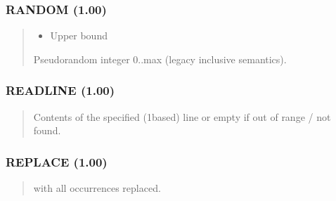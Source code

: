 \documentclass[letterpaper,10pt,english]{sphinxmanual}
\begin{document}
\subsubsection{RANDOM (1.00)}
\label{\detokenize{ppl:random-1-00}}\begin{quote}

\sphinxAtStartPar
{}
\begin{description}
\begin{itemize}
\item {} 
\sphinxAtStartPar
{} \textendash{} Upper bound

\end{itemize}

\sphinxAtStartPar
Pseudo\sphinxhyphen{}random integer 0..max (legacy inclusive semantics).

\end{description}
\end{quote}


\subsubsection{READLINE (1.00)}
\label{\detokenize{ppl:readline-1-00}}\begin{quote}

\sphinxAtStartPar
{}
\begin{description}
\sphinxAtStartPar
Contents of the specified (1\sphinxhyphen{}based) line or empty if out of range / not found.

\end{description}
\end{quote}


\subsubsection{REPLACE (1.00)}
\label{\detokenize{ppl:replace-1-00}}\begin{quote}

\sphinxAtStartPar
{}
\begin{description}
\sphinxAtStartPar
{} with all  occurrences replaced.

\end{description}
\end{quote}
\end{document}

